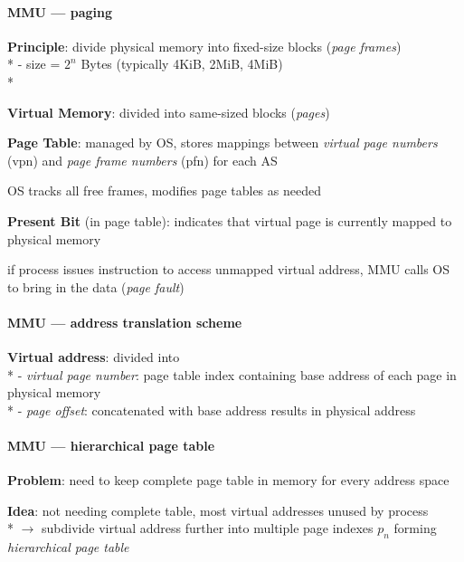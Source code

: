 \paragraph{MMU --- paging}
\begin{items}
  \item \textbf{Principle}: divide physical memory into fixed-size blocks (\emph{page frames}) \\*
    - size = \( 2^n \) Bytes (typically 4KiB, 2MiB, 4MiB) \\*
  \item \textbf{Virtual Memory}: divided into same-sized blocks (\emph{pages})
  \item \textbf{Page Table}: managed by OS, stores mappings between \emph{virtual page numbers} (vpn) and \emph{page frame numbers} (pfn) for each AS
  \item OS tracks all free frames, modifies page tables as needed
  \item \textbf{Present Bit} (in page table): indicates that virtual page is currently mapped to physical memory
  \item if process issues instruction to access unmapped virtual address, MMU calls OS to bring in the data (\emph{page fault})
\end{items}

\paragraph{MMU --- address translation scheme}
\begin{items}
  \item \textbf{Virtual address}: divided into \\*
    - \emph{virtual page number}: page table index containing base address of each page in physical memory \\*
    - \emph{page offset}: concatenated with base address results in physical address
\end{items}

\paragraph{MMU --- hierarchical page table}
\begin{items}
  \item \textbf{Problem}: need to keep complete page table in memory for every address space
  \item \textbf{Idea}: not needing complete table, most virtual addresses unused by process \\*
    \( \to \) subdivide virtual address further into multiple page indexes \( p_n \) forming \emph{hierarchical page table}
\end{items}


